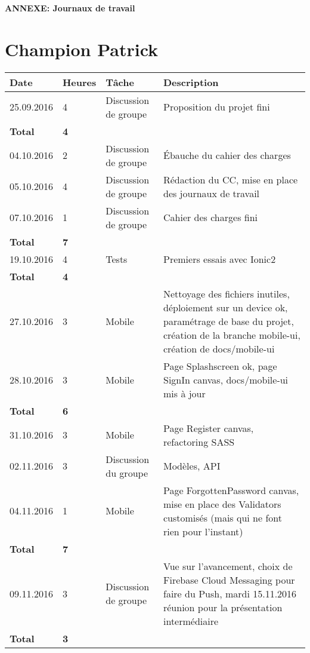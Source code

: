 \documentclass[french]{article}
\begin{document}
	\centering
	\large{\textbf{ANNEXE: Journaux de travail}}
	
	\justify
	
	\section*{Champion Patrick}
	\begin{longtable}{p{}|p{}|p{}|p{}}
		Date&Heures&Tâche&Description\\
		\hline \hline
		25.09.2016 & 4 & Discussion de groupe & Proposition du projet fini\\
		\textbf{Total} & \textbf{4} &&\\
		\hline
		04.10.2016 & 2 & Discussion de groupe & Ébauche du cahier des charges\\
		05.10.2016 & 4 & Discussion de groupe & Rédaction du CC, mise en place des journaux de travail\\
		07.10.2016 & 1 & Discussion de groupe & Cahier des charges fini\\
		\textbf{Total} & \textbf{7} &&\\
		\hline
		19.10.2016 & 4 & Tests & Premiers essais avec Ionic2\\
		\textbf{Total} & \textbf{4} &&\\
		\hline
		27.10.2016 & 3 & Mobile & Nettoyage des fichiers inutiles, déploiement sur un device ok, paramétrage de base du projet, création de la branche mobile-ui, création de docs/mobile-ui\\
		28.10.2016 & 3 & Mobile & Page Splashscreen ok, page SignIn canvas, docs/mobile-ui mis à jour\\
		\textbf{Total} & \textbf{6} &&\\
		\hline
		31.10.2016 & 3 & Mobile & Page Register canvas, refactoring SASS\\
		02.11.2016 & 3 & Discussion du groupe & Modèles, API\\
		04.11.2016 & 1 & Mobile & Page ForgottenPassword canvas, mise en place des Validators customisés (mais qui ne font rien pour l'instant)\\
		\textbf{Total} & \textbf{7} &&\\
		\hline
		09.11.2016 & 3 & Discussion de groupe & Vue sur l'avancement, choix de Firebase Cloud Messaging pour faire du Push, mardi 15.11.2016 réunion pour la présentation intermédiaire\\
		\textbf{Total} & \textbf{3} &&\\
		\hline

\end{longtable}
\end{document}
